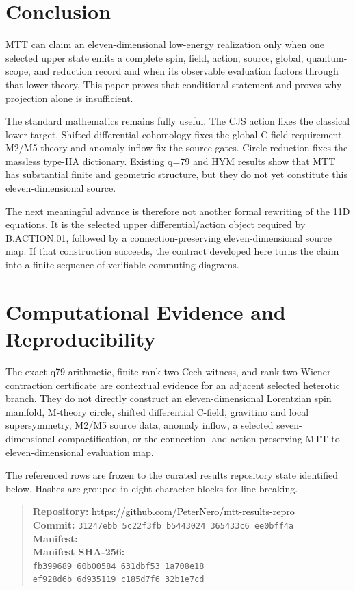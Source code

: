 \documentclass[11pt]{article}
\theoremstyle{definition}
\theoremstyle{remark}
\begin{document}
\section{Conclusion}

MTT can claim an eleven-dimensional low-energy realization only when one
selected upper state emits a complete spin, field, action, source, global,
quantum-scope, and reduction record and when its observable evaluation
factors through that lower theory.  This paper proves that conditional
statement and proves why projection alone is insufficient.

The standard mathematics remains fully useful.  The CJS action fixes the
classical lower target.  Shifted differential cohomology fixes the global
C-field requirement.  M2/M5 theory and anomaly inflow fix the source gates.
Circle reduction fixes the massless type-IIA dictionary.  Existing q=79 and
HYM results show that MTT has substantial finite and geometric structure,
but they do not yet constitute this eleven-dimensional source.

The next meaningful advance is therefore not another formal rewriting of the
11D equations.  It is the selected upper differential/action object required
by B.ACTION.01, followed by a connection-preserving eleven-dimensional
source map.  If that construction succeeds, the contract developed here
turns the claim into a finite sequence of verifiable commuting diagrams.



\section*{Computational Evidence and Reproducibility}
The exact q79 arithmetic, finite rank-two Cech witness, and rank-two Wiener-contraction certificate are contextual evidence for an adjacent selected heterotic branch. They do not directly construct an eleven-dimensional Lorentzian spin manifold, M-theory circle, shifted differential C-field, gravitino and local supersymmetry, M2/M5 source data, anomaly inflow, a selected seven-dimensional compactification, or the connection- and action-preserving MTT-to-eleven-dimensional evaluation map.

The referenced rows are frozen to the curated results repository state identified below. Hashes are grouped in eight-character blocks for line breaking.
\begin{quote}\small
\textbf{Repository:} \url{https://github.com/PeterNero/mtt-results-repro}\\
\textbf{Commit:} \texttt{31247ebb 5c22f3fb b5443024 365433c6 ee0bff4a}\\
\textbf{Manifest:} \\
\textbf{Manifest SHA-256:}\\
\texttt{fb399689 60b00584 631dbf53 1a708e18}\\
\texttt{ef928d6b 6d935119 c185d7f6 32b1e7cd}
\end{quote}
\end{document}
